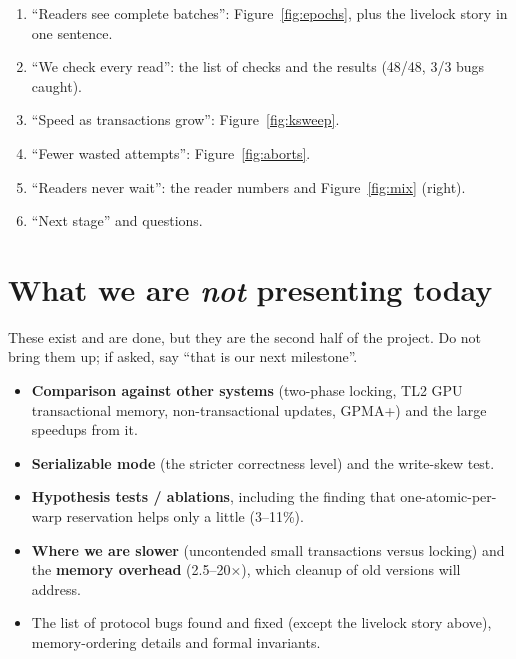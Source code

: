 \documentclass[11pt,a4paper]{article}
\begin{document}
\begin{slides}
\begin{enumerate}[leftmargin=*]
\item ``Readers see complete batches'': Figure~\ref{fig:epochs}, plus the livelock story in one sentence.
\item ``We check every read'': the list of checks and the results (48/48, 3/3 bugs caught).
\item ``Speed as transactions grow'': Figure~\ref{fig:ksweep}.
\item ``Fewer wasted attempts'': Figure~\ref{fig:aborts}.
\item ``Readers never wait'': the reader numbers and Figure~\ref{fig:mix} (right).
\item ``Next stage'' and questions.
\end{enumerate}
\end{slides}

\newpage
\section{What we are \emph{not} presenting today}
\label{sec:later}

\begin{dont}
These exist and are done, but they are the second half of the project. Do not bring them up; if asked, say
``that is our next milestone''.
\begin{itemize}
\item \textbf{Comparison against other systems} (two-phase locking, TL2 GPU transactional memory, non-transactional
  updates, GPMA+) and the large speedups from it.
\item \textbf{Serializable mode} (the stricter correctness level) and the write-skew test.
\item \textbf{Hypothesis tests / ablations}, including the finding that one-atomic-per-warp reservation helps only a
  little (3--11\%).
\item \textbf{Where we are slower} (uncontended small transactions versus locking) and the \textbf{memory overhead}
  (2.5--20$\times$), which cleanup of old versions will address.
\item The list of protocol bugs found and fixed (except the livelock story above), memory-ordering details and formal
  invariants.
\end{itemize}
\end{dont}
\end{document}
